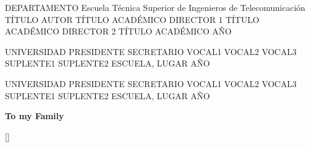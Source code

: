 \documentclass[twoside,a4paper,11pt]{book}
\begin{document}

\changepage{1.5in}{}{}{}{}{-0.5in}{}{}{}

\thesistitleDual
	{DEPARTAMENTO}
  {Escuela T\'{e}cnica Superior de Ingenieros de Telecomunicaci\'{o}n}
  {T\'{I}TULO}
	{AUTOR}
  {T\'{I}TULO ACAD\'{E}MICO}
	{DIRECTOR 1}
  {T\'{I}TULO ACAD\'{E}MICO}
	{DIRECTOR 2}
  {T\'{I}TULO ACAD\'{E}MICO}
  {A\~{N}O}

\newpage
\changepage{-1.5in}{}{}{}{}{0.5in}{}{}{}
\thispagestyle{empty}
\mbox{}
\newpage

\thesiscourt
  {UNIVERSIDAD}
  {PRESIDENTE}
  {SECRETARIO}
  {VOCAL1}
  {VOCAL2}
  {VOCAL3}
  {SUPLENTE1}
  {SUPLENTE2}
  {ESCUELA, LUGAR}
  {A\~{N}O}

\newpage
\thispagestyle{empty}
\mbox{}
\newpage
\thesiscourtOld
  {UNIVERSIDAD}
  {PRESIDENTE}
  {SECRETARIO}
  {VOCAL1}
  {VOCAL2}
  {VOCAL3}
  {SUPLENTE1}
  {SUPLENTE2}
  {ESCUELA, LUGAR}
  {A\~{N}O}
\newpage
\thispagestyle{empty}
\mbox{}
\newpage


\thispagestyle{plain}

\newpage
\thispagestyle{empty}
\mbox{}
\newpage


\thispagestyle{plain}

\newpage
\thispagestyle{empty}
\mbox{}
\newpage

\thispagestyle{empty}
\rule{0cm}{3cm}
\begin{flushright}
\textbf{To my Family} \\
\end{flushright}
\newpage
\thispagestyle{empty}
\mbox{}
\newpage

\thispagestyle{plain}

\newpage
\thispagestyle{empty}
\mbox{}
\newpage
[\vspace{2pc}{\titlerule[2pt]}]
{}
\tableofcontents
\newpage
\thispagestyle{empty}
\end{document}
